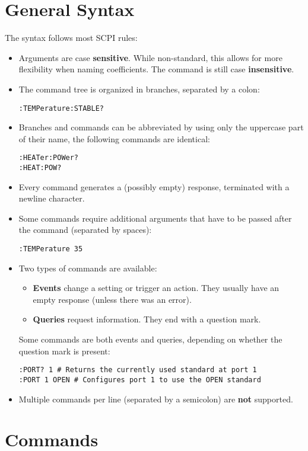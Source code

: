 \documentclass[a4paper,11pt]{article}
\begin{document}
\section{General Syntax}
The syntax follows most SCPI rules:
\begin{itemize}
\item Arguments are case \textbf{sensitive}. While non-standard, this allows for more flexibility when naming coefficients. The command is still case \textbf{insensitive}.
\item The command tree is organized in branches, separated by a colon:
\begin{lstlisting}
:TEMPerature:STABLE?
\end{lstlisting}
\item Branches and commands can be abbreviated by using only the uppercase part of their name, the following commands are identical:
\begin{lstlisting}
:HEATer:POWer?
:HEAT:POW?
\end{lstlisting}
\item Every command generates a (possibly empty) response, terminated with a newline character.
\item Some commands require additional arguments that have to be passed after the command (separated by spaces):
\begin{lstlisting}
:TEMPerature 35
\end{lstlisting}
\item Two types of commands are available:
\begin{itemize}
\item \textbf{Events} change a setting or trigger an action. They usually have an empty response (unless there was an error).
\item \textbf{Queries} request information. They end with a question mark.
\end{itemize}
Some commands are both events and queries, depending on whether the question mark is present:
\begin{lstlisting}
:PORT? 1 # Returns the currently used standard at port 1
:PORT 1 OPEN # Configures port 1 to use the OPEN standard
\end{lstlisting}
\item Multiple commands per line (separated by a semicolon) are \textbf{not} supported.
\end{itemize}
\section{Commands}
\end{document}
